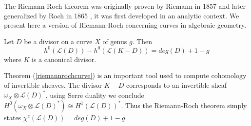 \documentclass[
	oldfontcommands,
	sumario=abnt-6027-2012,
	12pt,			%
	openright,		%
	oneside,		%
	a4paper,		%
	english,		%
	brazil			%
	]{imecc-unicamp}
\begin{document}
The Riemann-Roch theorem was originally proven by Riemann in 1857 \cite[Riemann]{Riemann} and later generalized by Roch in 1865 \cite[Roch]{Roch}, it was first developed in an analytic context. We present here a version of Riemann-Roch concerning curves in algebraic geometry.
\begin{theorem}\cite[Hartshorne, Riemann-Roch Theorem p.295]{hartshorne_2010}\label{riemannrochcurve}
	Let $D$ be a divisor on a curve $X$ of genus $g$. Then
	\begin{equation}
	h^0(\mathcal{L}(D))-h^0(\mathcal{L}(K-D))=deg(D)+1-g
	\end{equation}
	where $K$ is a canonical divisor.
\end{theorem}
Theorem (\ref{riemannrochcurve}) is an important tool used to compute cohomology of invertible sheaves. The divisor $K-D$ corresponds to an invertible sheaf $\omega_X \otimes \mathcal{L}(D)^*$, using Serre duality we conclude $H^0(\omega_X \otimes \mathcal{L}(D)^*) \cong H^1(\mathcal{L}(D))^*$. Thus the Riemann-Roch theorem simply states $\chi^e(\mathcal{L}(D))=deg(D)+1-g$.
\end{document}
